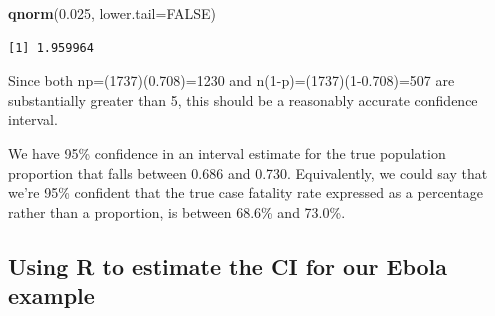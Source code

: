\documentclass[
]{book}
\newenvironment{Shaded}{\begin{snugshade}}{\end{snugshade}}
\newcommand{\DataTypeTok}[1]{\textcolor[rgb]{0.13,0.29,0.53}{#1}}
\newcommand{\FloatTok}[1]{\textcolor[rgb]{0.00,0.00,0.81}{#1}}
\newcommand{\KeywordTok}[1]{\textcolor[rgb]{0.13,0.29,0.53}{\textbf{#1}}}
\newcommand{\NormalTok}[1]{#1}
\newcommand{\OtherTok}[1]{\textcolor[rgb]{0.56,0.35,0.01}{#1}}
\begin{document}
\begin{Shaded}
\begin{Highlighting}[]
\KeywordTok{qnorm}\NormalTok{(}\FloatTok{0.025}\NormalTok{, }\DataTypeTok{lower.tail=}\OtherTok{FALSE}\NormalTok{)}
\end{Highlighting}
\end{Shaded}

\begin{verbatim}
[1] 1.959964
\end{verbatim}

Since both np=(1737)(0.708)=1230 and n(1-p)=(1737)(1-0.708)=507 are substantially greater than 5, this should be a reasonably accurate confidence interval.

We have 95\% confidence in an interval estimate for the true population proportion that falls between 0.686 and 0.730. Equivalently, we could say that we're 95\% confident that the true case fatality rate expressed as a percentage rather than a proportion, is between 68.6\% and 73.0\%.

\hypertarget{using-r-to-estimate-the-ci-for-our-ebola-example}{%
\subsection{Using R to estimate the CI for our Ebola example}\label{using-r-to-estimate-the-ci-for-our-ebola-example}}
\end{document}
